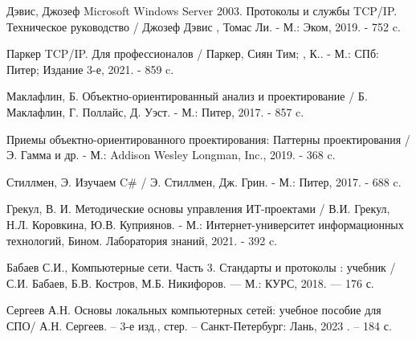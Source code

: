 \begin{thebibliography}{21}
    Дэвис, Джозеф Microsoft Windows Server 2003. Протоколы и службы TCP/IP. Техническое руководство / Джозеф Дэвис , Томас Ли. - М.: Эком, 2019. - 752 c.
    
    Паркер TCP/IP. Для профессионалов / Паркер, Сиян Тим; , К.. - М.: СПб: Питер; Издание 3-е, 2021. - 859 c.
    
    Маклафлин, Б. Объектно-ориентированный анализ и проектирование / Б. Маклафлин, Г. Поллайс, Д. Уэст. - М.: Питер, 2017. - 857 c.
    
    Приемы объектно-ориентированного проектирования: Паттерны проектирования / Э. Гамма и др. - М.: Addison Wesley Longman, Inc., 2019. - 368 c.
    
    Стиллмен, Э. Изучаем C\# / Э. Стиллмен, Дж. Грин. - М.: Питер, 2017. - 688 c.
    
    Грекул, В. И. Методические основы управления ИТ-проектами / В.И. Грекул, Н.Л. Коровкина, Ю.В. Куприянов. - М.: Интернет-университет информационных технологий, Бином. Лаборатория знаний, 2021. - 392 c.
    
    Бабаев С.И., Компьютерные сети. Часть 3. Стандарты и протоколы : учебник / С.И. Бабаев, Б.В. Костров, М.Б. Никифоров. — М.: КУРС, 2018. — 176 с.
    
    Сергеев А.Н. Основы локальных компьютерных сетей: учебное пособие для СПО/ А.Н. Сергеев. – 3-е изд., стер. – Санкт-Петербург: Лань, 2023 . – 184 с.
\end{thebibliography}
